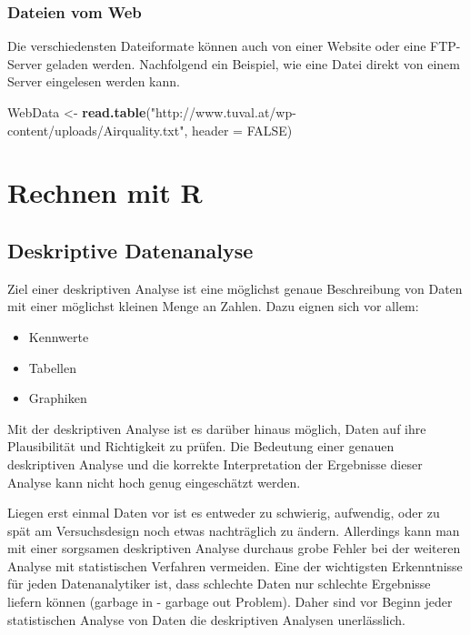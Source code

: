 \documentclass[]{article}
\newenvironment{Shaded}{\begin{snugshade}}{\end{snugshade}}
\newcommand{\KeywordTok}[1]{\textcolor[rgb]{0.13,0.29,0.53}{\textbf{#1}}}
\newcommand{\DataTypeTok}[1]{\textcolor[rgb]{0.13,0.29,0.53}{#1}}
\newcommand{\StringTok}[1]{\textcolor[rgb]{0.31,0.60,0.02}{#1}}
\newcommand{\OtherTok}[1]{\textcolor[rgb]{0.56,0.35,0.01}{#1}}
\newcommand{\NormalTok}[1]{#1}
\providecommand{\tightlist}{%
  \setlength{\itemsep}{0pt}\setlength{\parskip}{0pt}}
\begin{document}
\subsubsection*{Dateien vom Web}\label{dateien-vom-web}

Die verschiedensten Dateiformate können auch von einer Website oder eine
FTP-Server geladen werden. Nachfolgend ein Beispiel, wie eine Datei
direkt von einem Server eingelesen werden kann.

\begin{Shaded}
\begin{Highlighting}[]
\NormalTok{    WebData <-}\StringTok{ }\KeywordTok{read.table}\NormalTok{(}\StringTok{"http://www.tuval.at/wp-content/uploads/Airquality.txt"}\NormalTok{, }\DataTypeTok{header =} \OtherTok{FALSE}\NormalTok{)}
\end{Highlighting}
\end{Shaded}

\section{Rechnen mit R}\label{rechnen-mit-r}

\subsection*{Deskriptive Datenanalyse}\label{deskriptive-datenanalyse}

Ziel einer deskriptiven Analyse ist eine möglichst genaue Beschreibung
von Daten mit einer möglichst kleinen Menge an Zahlen. Dazu eignen sich
vor allem:

\begin{itemize}
\tightlist
\item
  Kennwerte
\item
  Tabellen
\item
  Graphiken
\end{itemize}

Mit der deskriptiven Analyse ist es darüber hinaus möglich, Daten auf
ihre Plausibilität und Richtigkeit zu prüfen. Die Bedeutung einer
genauen deskriptiven Analyse und die korrekte Interpretation der
Ergebnisse dieser Analyse kann nicht hoch genug eingeschätzt werden.

Liegen erst einmal Daten vor ist es entweder zu schwierig, aufwendig,
oder zu spät am Versuchsdesign noch etwas nachträglich zu ändern.
Allerdings kann man mit einer sorgsamen deskriptiven Analyse durchaus
grobe Fehler bei der weiteren Analyse mit statistischen Verfahren
vermeiden. Eine der wichtigsten Erkenntnisse für jeden Datenanalytiker
ist, dass schlechte Daten nur schlechte Ergebnisse liefern können
(garbage in - garbage out Problem). Daher sind vor Beginn jeder
statistischen Analyse von Daten die deskriptiven Analysen unerlässlich.
\end{document}
